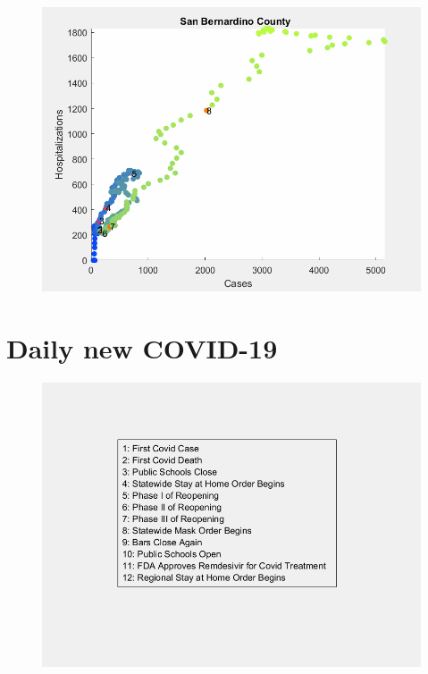 \documentclass[12pt]{article}
\begin{document}
\begin{figure}[!h]
	\includegraphics[width=\linewidth]{images/san_bernardino_cases_hospitalizations_scatter-7lag.png}
	\caption{}
	\label{fig:images/san_bernardino_cases_hospitalizations_scatter-7lagLabel}
\end{figure}

\FloatBarrier

\section{Daily new COVID-19 }

\begin{figure}[!h]
	\includegraphics[width=\linewidth]{legends/CaliforniaLegend.png}
	\caption{}
	\label{fig:legends/CaliforniaLegendLabel}
\end{figure}
\end{document}
